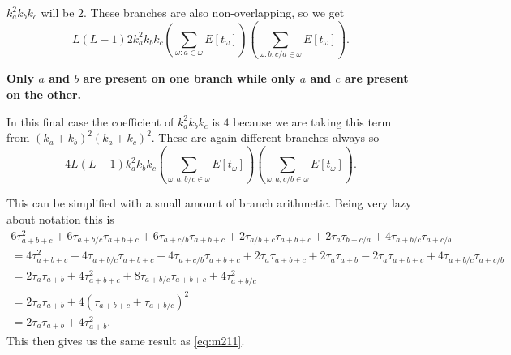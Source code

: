 $k_a^2k_bk_c$ will be $2$. These branches are also non-overlapping, so we get
\begin{equation*}
  L(L-1) 2 k_a^2k_bk_c \left( \sum_{\omega: a \in \omega} E[t_\omega] \right)
  \left( \sum_{\omega: b,c/a \in \omega} E[t_\omega] \right).
\end{equation*}
\begin{flushleft}
  \textbf{Only $a$ and $b$ are present on one branch while only $a$ and $c$ are
    present on the other.}\\
\end{flushleft}
In this final case the coefficient of $k_a^2k_bk_c$ is $4$ because we are taking
this term from $(k_a+k_b)^2(k_a+k_c)^2$. These are again different branches
always so
\begin{equation*}
  4L(L-1)k_a^2k_bk_c \left( \sum_{\omega: a,b/c \in \omega} E[t_\omega] \right)
  \left( \sum_{\omega: a,c/b \in \omega} E[t_\omega] \right).
\end{equation*}

This can be simplified with a small amount of branch arithmetic. Being very lazy
about notation this is
\begin{align*}
  6\tau_{a+b+c}^2 + 6\tau_{a+b/c}\tau_{a+b+c} + 6\tau_{a+c/b}\tau_{a+b+c} + 2\tau_{a/b+c}\tau_{a+b+c} +
  2\tau_a\tau_{b+c/a} + 4\tau_{a+b/c}\tau_{a+c/b}\\
  = 4\tau_{a+b+c}^2 + 4\tau_{a+b/c}\tau_{a+b+c} + 4\tau_{a+c/b}\tau_{a+b+c} + 2\tau_{a}\tau_{a+b+c} +
  2\tau_a\tau_{a+b} - 2\tau_a\tau_{a+b+c} + 4\tau_{a+b/c}\tau_{a+c/b}\\
  = 2\tau_a\tau_{a+b} + 4\tau_{a+b+c}^2 + 8\tau_{a+b/c}\tau_{a+b+c} + 4\tau_{a+b/c}^2\\
  = 2\tau_a\tau_{a+b} + 4(\tau_{a+b+c} + \tau_{a+b/c})^2\\
  = 2\tau_a\tau_{a+b} + 4\tau_{a+b}^2.
\end{align*}
This then gives us the same result as \eqref{eq:m211}.
